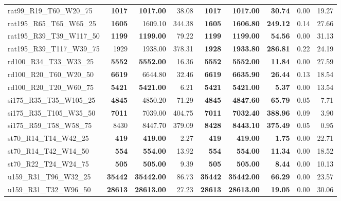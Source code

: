 \documentclass{singlecol-new}
\begin{document}
{\begin{longtable}{lrrrrrrrr}
		rat99\_R19\_T60\_W20\_75 & \textbf{1017} & \textbf{1017.00} & 38.08 & \textbf{1017} & \textbf{1017.00} & \textbf{30.74} & 0.00 & 19.27 \\
		rat195\_R65\_T65\_W65\_25 & \textbf{1605} & 1609.10 & 344.38 & \textbf{1605} & \textbf{1606.80} & \textbf{249.12} & 0.14 & 27.66 \\
		rat195\_R39\_T39\_W117\_50 & \textbf{1199} & \textbf{1199.00} & 79.22 & \textbf{1199} & \textbf{1199.00} & \textbf{54.56} & 0.00 & 31.13 \\
		rat195\_R39\_T117\_W39\_75 & 1929 & 1938.00 & 378.31 & \textbf{1928} & \textbf{1933.80} & \textbf{286.81} & 0.22 & 24.19 \\
		rd100\_R34\_T33\_W33\_25 & \textbf{5552} & \textbf{5552.00} & 16.36 & \textbf{5552} & \textbf{5552.00} & \textbf{11.84} & 0.00 & 27.59 \\
		rd100\_R20\_T60\_W20\_50 & \textbf{6619} & 6644.80 & 32.46 & \textbf{6619} & \textbf{6635.90} & \textbf{26.44} & 0.13 & 18.54 \\
		rd100\_R20\_T20\_W60\_75 & \textbf{5421} & \textbf{5421.00} & 6.21 & \textbf{5421} & \textbf{5421.00} & \textbf{5.37} & 0.00 & 13.54 \\
		si175\_R35\_T35\_W105\_25 & \textbf{4845} & 4850.20 & 71.29 & \textbf{4845} & \textbf{4847.60} & \textbf{65.79} & 0.05 & 7.71 \\
		si175\_R35\_T105\_W35\_50 & \textbf{7011} & 7039.00 & 404.75 & \textbf{7011} & \textbf{7032.40} & \textbf{388.96} & 0.09 & 3.90 \\
		si175\_R59\_T58\_W58\_75 & 8430 & 8447.70 & 379.09 & \textbf{8428} & \textbf{8443.10} & \textbf{375.49} & 0.05 & 0.95 \\
		st70\_R14\_T14\_W42\_25 & \textbf{419} & \textbf{419.00} & 2.27 & \textbf{419} & \textbf{419.00} & \textbf{1.75} & 0.00 & 22.71 \\
		st70\_R14\_T42\_W14\_50 & \textbf{554} & \textbf{554.00} & 13.92 & \textbf{554} & \textbf{554.00} & \textbf{11.34} & 0.00 & 18.52 \\
		st70\_R22\_T24\_W24\_75 & \textbf{505} & \textbf{505.00} & 9.39 & \textbf{505} & \textbf{505.00} & \textbf{8.44} & 0.00 & 10.13 \\
		u159\_R31\_T96\_W32\_25 & \textbf{35442} & \textbf{35442.00} & 86.73 & \textbf{35442} & \textbf{35442.00} & \textbf{66.29} & 0.00 & 23.57 \\
		u159\_R31\_T32\_W96\_50 & \textbf{28613} & \textbf{28613.00} & 27.23 & \textbf{28613} & \textbf{28613.00} & \textbf{19.05} & 0.00 & 30.06 \\

\end{longtable}}
\end{document}
